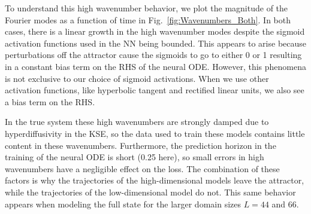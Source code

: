 \documentclass[preprint,aps,pre,letterpaper,onecolumn,superscriptaddress]{revtex4-2} %
\begin{document}

To understand this high wavenumber behavior, we plot the magnitude of the Fourier modes as a function of time in Fig.\ \ref{fig:Wavenumbers_Both}. In both cases, there is a linear growth in the high wavenumber modes despite the sigmoid activation functions used in the NN being bounded. This appears to arise because perturbations off the attractor cause the sigmoids to go to either 0 or 1 resulting in a constant bias term on the RHS of the neural ODE. However, this phenomena is not exclusive to our choice of sigmoid activations. When we use other activation functions, like hyperbolic tangent and rectified linear units, we also see a bias term on the RHS.

 


In the true system these high wavenumbers are strongly damped due to hyperdiffusivity in the KSE, so the data used to train these models contains little content in these wavenumbers. Furthermore, the prediction horizon in the training of the neural ODE is short  (0.25 here), so small errors in high wavenumbers have a negligible effect on the loss. %
The combination of these factors is why the trajectories of the high-dimensional models leave the attractor, while the trajectories of the low-dimensional model do not. This same behavior appears when modeling the full state for the larger domain sizes $L=44$ and $66$.
\end{document}
